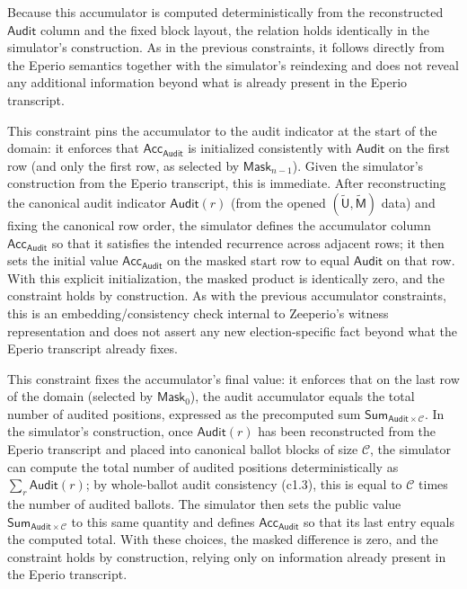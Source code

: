 Because this accumulator is computed deterministically from the reconstructed $\mathsf{Audit}$ column and the fixed block layout, the relation holds identically in the simulator’s construction. As in the previous constraints, it follows directly from the Eperio semantics together with the simulator’s reindexing and does not reveal any additional information beyond what is already present in the Eperio transcript.


This constraint pins the accumulator to the audit indicator at the start of the domain: it enforces that
$\mathsf{Acc}_{\mathsf{Audit}}$ is initialized consistently with $\mathsf{Audit}$ on the first row (and only the first row,
as selected by $\mathsf{Mask}_{n-1}$). Given the simulator’s construction from the Eperio transcript, this is immediate.
After reconstructing the canonical audit indicator $\mathsf{Audit}(r)$ (from the opened $(\widetilde{\mathsf{U}},\widetilde{\mathsf{M}})$
data) and fixing the canonical row order, the simulator defines the accumulator column $\mathsf{Acc}_{\mathsf{Audit}}$
so that it satisfies the intended recurrence across adjacent rows; it then sets the initial value
$\mathsf{Acc}_{\mathsf{Audit}}$ on the masked start row to equal $\mathsf{Audit}$ on that row. With this explicit
initialization, the masked product is identically zero, and the constraint holds by construction. As with the previous
accumulator constraints, this is an embedding/consistency check internal to Zeeperio’s witness representation and does not
assert any new election-specific fact beyond what the Eperio transcript already fixes.


This constraint fixes the accumulator’s final value: it enforces that on the last row of the domain (selected by
$\mathsf{Mask}_{0}$), the audit accumulator equals the total number of audited positions, expressed as the precomputed
sum $\mathsf{Sum}_{\mathsf{Audit}\times\mathcal{C}}$. In the simulator’s construction, once $\mathsf{Audit}(r)$ has been
reconstructed from the Eperio transcript and placed into canonical ballot blocks of size $\mathcal{C}$, the simulator can
compute the total number of audited positions deterministically as $\sum_r \mathsf{Audit}(r)$; by whole-ballot audit
consistency (c1.3), this is equal to $\mathcal{C}$ times the number of audited ballots. The simulator then sets the
public value $\mathsf{Sum}_{\mathsf{Audit}\times\mathcal{C}}$ to this same quantity and defines
$\mathsf{Acc}_{\mathsf{Audit}}$ so that its last entry equals the computed total. With these choices, the masked
difference is zero, and the constraint holds by construction, relying only on information already present in the Eperio
transcript.

